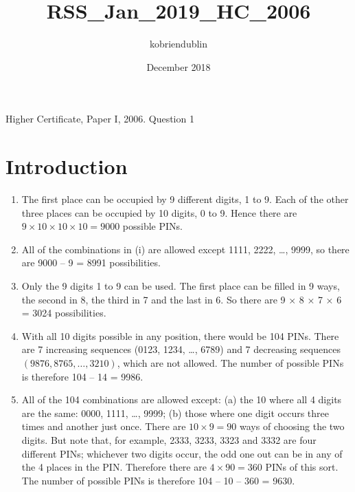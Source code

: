 \documentclass{article}
\title{RSS_Jan_2019_HC_2006}
\author{kobriendublin }
\date{December 2018}
\begin{document}
Higher Certificate, Paper I, 2006. Question 1

\section{Introduction}
\begin{enumerate}
    \item The first place can be occupied by 9 different digits, 1 to 9. Each of the other three places can be occupied by 10 digits, 0 to 9.
Hence there are $9 × 10 × 10 × 10 = 9000$ possible PINs.
\item All of the combinations in (i) are allowed except 1111, 2222, …, 9999, so there are 9000 – 9 = 8991 possibilities.

\item Only the 9 digits 1 to 9 can be used. The first place can be filled in 9 ways, the second in 8, the third in 7 and the last in 6. So there are 9 × 8 × 7 × 6 = 3024 possibilities.
\item With all 10 digits possible in any position, there would be 104 PINs. There are 7 increasing sequences (0123, 1234, …, 6789) and 7 decreasing sequences $(9876, 8765, \ldots, 3210)$, which are not allowed. The number of possible PINs is therefore 104 – 14 = 9986.
\item All of the 104 combinations are allowed except:
(a) the 10 where all 4 digits are the same: 0000, 1111, …, 9999;
(b) those where one digit occurs three times and another just once. There are $10 \times 9 = 90$ ways of choosing the two digits. But note that, for example, 2333, 3233, 3323 and 3332 are four different PINs; whichever two digits occur, the odd one out can be in any of the 4 places in the PIN. Therefore there are $4 \times 90 = 360$ PINs of this sort.
The number of possible PINs is therefore 104 – 10 – 360 = 9630.
\end{enumerate}
\end{document}
